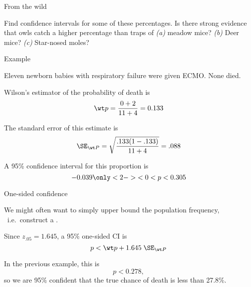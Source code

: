 \begin{frame}{From the wild}

    \begin{center}
    \end{center}

    \vspace{2em}

    Find confidence intervals for some of these percentages.  
    Is there strong evidence that owls catch a higher percentage than traps of 
    \textit{(a)} meadow mice?
    \textit{(b)} Deer mice?
    \textit{(c)} Star-nosed moles?


\end{frame}

\begin{frame}{Example}

    Eleven newborn babies with respiratory failure were given ECMO.  None died.

    \vspace{2em}

    \alert{Wilson's estimator} of the probability of death is
    \[ \wt p = \frac{0+2}{11+4} = 0.133 \]

    \vspace{2em}

    The \alert{standard error} of this estimate is
    \[ \SE_{\wt P} = \sqrt{\frac{ .133(1-.133) }{ 11+4 }} = .088 \]

    \vspace{2em}

    A \alert{95\% confidence interval} for this proportion is
        \[ -0.039 \only<2->{ < 0 }< p < 0.305 \]


\end{frame}

\begin{frame}{One-sided confidence}

    We might often want to simply \alert{upper bound} the population frequency,\\\
    i.e.\ construct a .

    \vspace{2em}

    Since $z_{.05} = 1.645$, 
    a \alert{95\% one-sided CI} is 
        \[ p < \wt p + 1.645 \; \SE_{\wt P} \]

    \vspace{2em}

    In the previous example, this is
        \[ p < 0.278 , \]
    so we are 95\% confident that the true chance of death is less than 27.8\%.


\end{frame}

